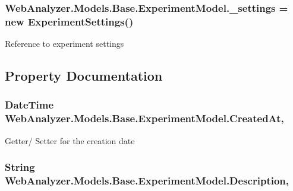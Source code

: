 \subsubsection[{\+\_\+settings}]{ Web\+Analyzer.\+Models.\+Base.\+Experiment\+Model.\+\_\+settings = new {\bf Experiment\+Settings}()\hspace{0.3cm}{\ttfamily [private]}}\label{class_web_analyzer_1_1_models_1_1_base_1_1_experiment_model_ae907589850044fa39b4f1991c60d95ad}


Reference to experiment settings 



\subsection{Property Documentation}
\hypertarget{class_web_analyzer_1_1_models_1_1_base_1_1_experiment_model_a8f50de0ba85fe31f3db2a194a66ed084}{}
\subsubsection[{Created\+At}]{\setlength{\rightskip}{0pt plus 5cm}Date\+Time Web\+Analyzer.\+Models.\+Base.\+Experiment\+Model.\+Created\+At\hspace{0.3cm}{\ttfamily [get]}, {\ttfamily [set]}}\label{class_web_analyzer_1_1_models_1_1_base_1_1_experiment_model_a8f50de0ba85fe31f3db2a194a66ed084}


Getter/ Setter for the creation date 

\hypertarget{class_web_analyzer_1_1_models_1_1_base_1_1_experiment_model_a3f18f9046fa10178e80e77cb433af681}{}
\subsubsection[{Description}]{\setlength{\rightskip}{0pt plus 5cm}String Web\+Analyzer.\+Models.\+Base.\+Experiment\+Model.\+Description\hspace{0.3cm}{\ttfamily [get]}, {\ttfamily [set]}}\label{class_web_analyzer_1_1_models_1_1_base_1_1_experiment_model_a3f18f9046fa10178e80e77cb433af681}


